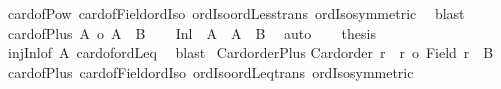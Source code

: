 \begin{isabellebody}
%
\endisadelimproof
%
\isatagproof
{}\isamarkupfalse%
\ card{\isacharunderscore}{\kern0pt}of{\isacharunderscore}{\kern0pt}Pow\ card{\isacharunderscore}{\kern0pt}of{\isacharunderscore}{\kern0pt}Field{\isacharunderscore}{\kern0pt}ordIso\ ordIso{\isacharunderscore}{\kern0pt}ordLess{\isacharunderscore}{\kern0pt}trans\ ordIso{\isacharunderscore}{\kern0pt}symmetric\ \isamarkupfalse%
\ blast%
\endisatagproof
{\isafoldproof}%
%
\isadelimproof
\isanewline
%
\endisadelimproof
\isanewline
{}\isamarkupfalse%
\ card{\isacharunderscore}{\kern0pt}of{\isacharunderscore}{\kern0pt}Plus{}{\isacharcolon}{\kern0pt}\ {\isachardoublequoteopen}{\isacharbar}{\kern0pt}A{\isacharbar}{\kern0pt}\ {\isasymle}o\ {\isacharbar}{\kern0pt}A\ {\isacharless}{\kern0pt}{\isacharplus}{\kern0pt}{\isachargreater}{\kern0pt}\ B{\isacharbar}{\kern0pt}{\isachardoublequoteclose}\isanewline
%
\isadelimproof
%
\endisadelimproof
%
\isatagproof
{}\isamarkupfalse%
{\isacharminus}{\kern0pt}\isanewline
\ \ \isamarkupfalse%
\ {\isachardoublequoteopen}Inl\ {\isacharbackquote}{\kern0pt}\ A\ {\isasymle}\ A\ {\isacharless}{\kern0pt}{\isacharplus}{\kern0pt}{\isachargreater}{\kern0pt}\ B{\isachardoublequoteclose}\ \isamarkupfalse%
\ auto\isanewline
\ \ \isamarkupfalse%
\ {\isacharquery}{\kern0pt}thesis\ \isamarkupfalse%
\ inj{\isacharunderscore}{\kern0pt}Inl{\isacharbrackleft}{\kern0pt}of\ A{\isacharbrackright}{\kern0pt}\ card{\isacharunderscore}{\kern0pt}of{\isacharunderscore}{\kern0pt}ordLeq\ \isamarkupfalse%
\ blast\isanewline
{}\isamarkupfalse%
%
\endisatagproof
{\isafoldproof}%
%
\isadelimproof
\isanewline
%
\endisadelimproof
\isanewline
{}\isamarkupfalse%
\ Card{\isacharunderscore}{\kern0pt}order{\isacharunderscore}{\kern0pt}Plus{}{\isacharcolon}{\kern0pt}\isanewline
{\isachardoublequoteopen}Card{\isacharunderscore}{\kern0pt}order\ r\ {\isasymLongrightarrow}\ r\ {\isasymle}o\ {\isacharbar}{\kern0pt}{\isacharparenleft}{\kern0pt}Field\ r{\isacharparenright}{\kern0pt}\ {\isacharless}{\kern0pt}{\isacharplus}{\kern0pt}{\isachargreater}{\kern0pt}\ B{\isacharbar}{\kern0pt}{\isachardoublequoteclose}\isanewline
%
\isadelimproof
%
\endisadelimproof
%
\isatagproof
{}\isamarkupfalse%
\ card{\isacharunderscore}{\kern0pt}of{\isacharunderscore}{\kern0pt}Plus{}\ card{\isacharunderscore}{\kern0pt}of{\isacharunderscore}{\kern0pt}Field{\isacharunderscore}{\kern0pt}ordIso\ ordIso{\isacharunderscore}{\kern0pt}ordLeq{\isacharunderscore}{\kern0pt}trans\ ordIso{\isacharunderscore}{\kern0pt}symmetric\ \isamarkupfalse%

\end{isabellebody}
